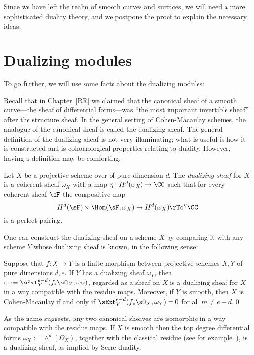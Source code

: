 Since we have left the realm of smooth curves and surfaces, we will need a more sophisticated duality theory, and we
postpone the proof to explain the necessary ideas.

\section{Dualizing modules}\label{duality}

To go further, we will use some facts about the dualizing modules:

Recall that in Chapter~\ref{RR} we claimed that the canonical sheaf of a smooth curve---the sheaf of differential forms---was ``the most important invertible sheaf'' after the structure sheaf. In the general setting of Cohen-Macaulay schemes, the analogue of the canonical sheaf is called the dualizing sheaf.
The general definition of the dualizing sheaf is not very illuminating; what is useful is how it is constructed and is cohomological properties relating to duality.
However, having a definition may be comforting. 

\begin{definition}
Let $X$ be a projective scheme over of pure dimension $d$. The \emph{dualizing sheaf} for $X$ is a coherent sheaf $\omega_X$ 
with a map $\eta: H^d(\omega_X) \to \CC$ such that for every coherent sheaf  $\sF$ the compositive map
$$
H^d(\sF) \times \Hom(\sF, \omega_X) \to H^d(\omega_X) \rTo^\eta \CC
$$
is a perfect pairing. 
\end{definition}

One can construct the dualizing sheaf on a scheme
$X$ by comparing it with any scheme $Y$ whose dualizing sheaf is known, in the following sense:
\begin{fact} \label{construction of dualizing sheaf}
\begin{theorem}\label{omega}\label{general adjunction}
Suppose that $f: X\to Y$ is a finite morphism between projective schemes $X,Y$ of pure dimensions $d,e$. If $Y$ has a dualizing sheaf $\omega_Y$,
then $\omega := \sExt_Y^{e-d}(f_*\sO_X,  \omega_Y)$, regarded as a sheaf on $X$ is a dualizing sheaf for $X$ in a way compatible with the residue maps.
Moreover, if $Y$ is smooth, then $X$ is Cohen-Macaulay if and only if $ \sExt_Y^{e-d}(f_*\sO_X,  \omega_Y)= 0$ for all $m\neq e-d$.\qed
\end{theorem}
\end{fact}

As the name suggests, any two canonical sheaves are isomorphic in a way compatible with the
residue maps. If $X$ is smooth then the top degree differential forms $\omega_X :=\wedge^d(\Omega_X)$,
together with the classical residue (see for example~\cite[p. 648, 708]{Griffiths-Harris1978}), is a dualizing sheaf, as implied by Serre duality. 


